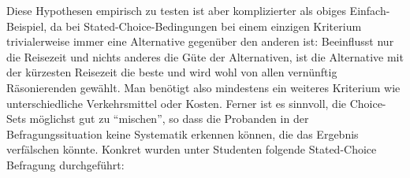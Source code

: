 Diese Hypothesen empirisch zu testen ist aber komplizierter als obiges
Einfach-Beispiel, da bei Stated-Choice-Bedingungen bei 
einem einzigen Kriterium  trivialerweise immer eine
Alternative  gegen\"uber den anderen ist: Beeinflusst nur
die Reisezeit und nichts anderes die G\"ute der Alternativen, 
ist die Alternative mit der k\"urzesten Reisezeit die beste und wird
wohl von allen vern\"unftig R\"asonierenden gew\"ahlt. Man ben\"otigt also mindestens ein weiteres
Kriterium wie unterschiedliche Verkehrsmittel oder Kosten. Ferner ist
es sinnvoll, die Choice-Sets m\"oglichst gut zu ``mischen'', so dass
die Probanden in der Befragungssituation keine Systematik erkennen
k\"onnen, die das Ergebnis verf\"alschen k\"onnte. 
Konkret wurden unter Studenten folgende  Stated-Choice Befragung
durchgef\"uhrt:



